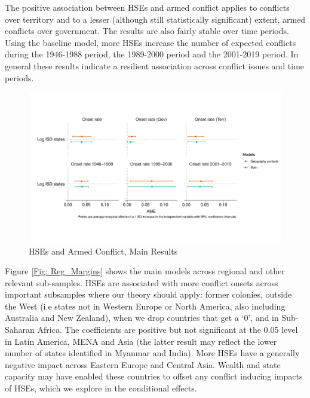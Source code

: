 The positive association between HSEs and armed conflict applies to conflicts
over territory and to a lesser (although still statistically significant)
extent, armed conflicts over government. The results are also fairly stable over
time periods. Using the baseline model, more HSEs increase the number of
expected conflicts during the 1946-1988 period, the 1989-2000 period and the
2001-2019 period. In general these results
indicate a resilient association across conflict issues and time
periods. 


\begin{figure}[!htb]
\includegraphics[width=\textwidth,keepaspectratio]{img/main_margins.pdf}
\caption{HSEs and Armed Conflict, Main Results} \label{Fig: Main_Margins}
\end{figure}


Figure \ref{Fig: Reg_Margins} shows the main models across regional and other
relevant sub-samples. HSEs are associated with more conflict onsets across
important subsamples where our theory should apply: former colonies, outside the
West (i.e states not in Western Europe or North America, also including
Australia and New Zealand), when we drop countries that get a `0', and in
Sub-Saharan Africa. The coefficients are positive but not significant at the
0.05 level in Latin America, MENA and Asia (the latter result may reflect the
lower number of states identified in Myanmar and India). More HSEs have a
generally negative impact across Eastern Europe and Central Asia. Wealth and
state capacity may have enabled these countries to offset any conflict inducing
impacts of HSEs, which we explore in the conditional effects. 

